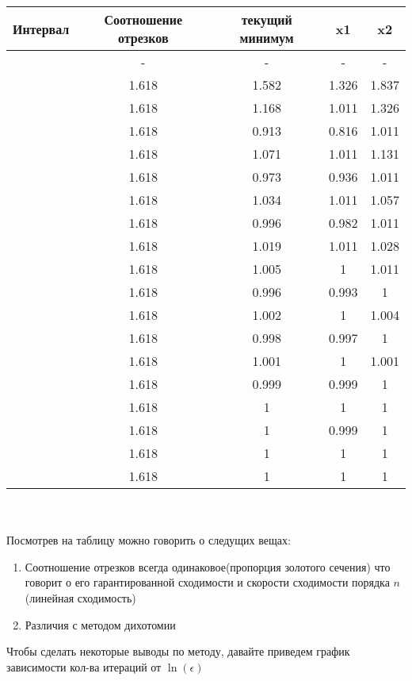 \documentclass[a4paper, 14pt]{article}
\begin{document}
	\begin{tabular}{|c |c| c| c| c|}
		\hline
		Интервал & Соотношение отрезков & текущий минимум & x1 & x2\\
		\hline
		[0.5, 4] & - & -& - & - \\
		\hline
		[0.5, 2.663] & 1.618 & 1.582 & 1.326 & 1.837\\
\hline
[0.5, 1.837] & 1.618 & 1.168 & 1.011 & 1.326\\
\hline
[0.5, 1.326] & 1.618 & 0.913 & 0.816 & 1.011\\
\hline
[0.816, 1.326] & 1.618 & 1.071 & 1.011 & 1.131\\
\hline
[0.816, 1.131] & 1.618 & 0.973 & 0.936 & 1.011\\
\hline
[0.936, 1.131] & 1.618 & 1.034 & 1.011 & 1.057\\
\hline
[0.936, 1.057] & 1.618 & 0.996 & 0.982 & 1.011\\
\hline
[0.982, 1.057] & 1.618 & 1.019 & 1.011 & 1.028\\
\hline
[0.982, 1.028] & 1.618 & 1.005 & 1 & 1.011\\
\hline
[0.982, 1.011] & 1.618 & 0.996 & 0.993 & 1\\
\hline
[0.993, 1.011] & 1.618 & 1.002 & 1 & 1.004\\
\hline
[0.993, 1.004] & 1.618 & 0.998 & 0.997 & 1\\
\hline
[0.997, 1.004] & 1.618 & 1.001 & 1 & 1.001\\
\hline
[0.997, 1.001] & 1.618 & 0.999 & 0.999 & 1\\
\hline
[0.999, 1.001] & 1.618 & 1 & 1 & 1\\
\hline
[0.999, 1] & 1.618 & 1 & 0.999 & 1\\
\hline
[0.999, 1] & 1.618 & 1 & 1 & 1\\
\hline
[1, 1] & 1.618 & 1 & 1 & 1\\
\hline
	\end{tabular} \\\\
	Посмотрев на таблицу можно говорить о следущих вещах:
		\begin{enumerate}
		\item Соотношение отрезков всегда одинаковое(пропорция золотого сечения) что говорит о его гарантированной сходимости и скорости сходимости порядка $n$(линейная сходимость)
		\item Различия с методом дихотомии
		\end{enumerate}
		
		Чтобы сделать некоторые выводы по методу, давайте приведем график зависимости кол-ва итераций от $\ln(\epsilon)$
		
\end{document}
